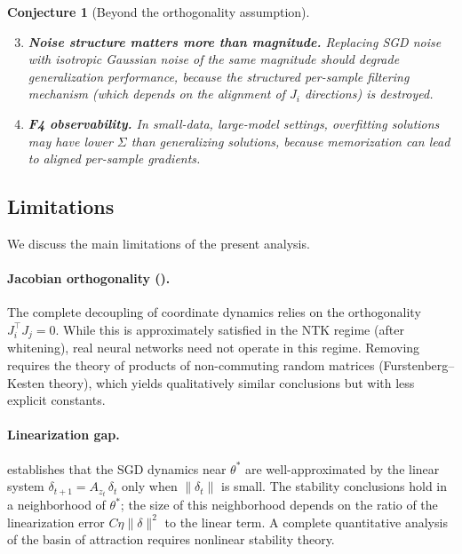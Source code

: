 \documentclass[11pt,a4paper]{article}
\newtheorem{conjecture}[theorem]{Conjecture}
\theoremstyle{definition}
\theoremstyle{remark}
\begin{document}
\begin{conjecture}[Beyond the orthogonality assumption]\label{conj:beyond}
  \begin{enumerate}[label=(G\arabic*)]
    \setcounter{enumi}{2}
    \item \label{pred:noise-struct}
      \textbf{Noise structure matters more than magnitude.}\;
      Replacing SGD noise with isotropic Gaussian noise of the same magnitude should
      degrade generalization performance, because the structured per-sample filtering
      mechanism (which depends on the alignment of $J_i$ directions) is destroyed.

    \item \label{pred:F4}
      \textbf{F4 observability.}\;
      In small-data, large-model settings, overfitting solutions may have
      \emph{lower} $\Sigma$ than generalizing solutions, because memorization can
      lead to aligned per-sample gradients.
  \end{enumerate}
\end{conjecture}

\subsection{Limitations}

We discuss the main limitations of the present analysis.

\paragraph{Jacobian orthogonality ().}
The complete decoupling of coordinate dynamics relies on the orthogonality
$J_i^\top J_j = 0$.  While this is approximately satisfied in the NTK regime
(after whitening), real neural networks need not operate in this regime.
Removing  requires the theory of products of non-commuting random
matrices (Furstenberg--Kesten theory), which yields qualitatively similar conclusions
but with less explicit constants.

\paragraph{Linearization gap.}
 establishes that the SGD dynamics near $\theta^*$ are
well-approximated by the linear system $\delta_{t+1} = A_{z_t}\,\delta_t$ only when
$\|\delta_t\|$ is small.  The stability conclusions hold in a neighborhood of
$\theta^*$; the size of this neighborhood depends on the ratio of the linearization
error $C\eta\|\delta\|^2$ to the linear term.  A complete quantitative analysis of
the basin of attraction requires nonlinear stability theory.
\end{document}
